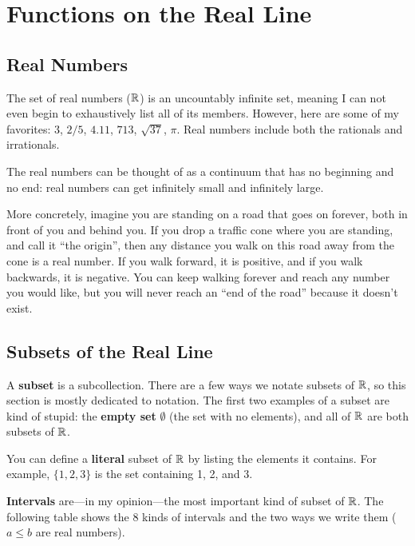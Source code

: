 \section{Functions on the Real Line}

\subsection{Real Numbers}

The set of real numbers ($\mathbb{R}$) is an uncountably infinite set, meaning I can not even begin to exhaustively list all of its members. However, here are some of my favorites: $3$, $2/5$, $4.11$, $713$, $\sqrt{37}$, $\pi$. Real numbers include both the rationals and irrationals. 

The real numbers can be thought of as a continuum that has no beginning and no end: real numbers can get infinitely small and infinitely large.

More concretely, imagine you are standing on a road that goes on forever, both in front of you and behind you. If you drop a traffic cone where you are standing, and call it ``the origin'', then any distance you walk on this road away from the cone is a real number. If you walk forward, it is positive, and if you walk backwards, it is negative. You can keep walking forever and reach any number you would like, but you will never reach an ``end of the road'' because it doesn't exist.

\subsection{Subsets of the Real Line}

A \textbf{subset} is a subcollection. There are a few ways we notate subsets of $\mathbb{R}$, so this section is mostly dedicated to notation. The first two examples of a subset are kind of stupid: the \textbf{empty set} $\emptyset$ (the set with no elements), and all of $\mathbb{R}$ are both subsets of $\mathbb{R}$.

You can define a \textbf{literal} subset of $\mathbb{R}$ by listing the elements it contains. For example, $\{1,2,3\}$ is the set containing 1, 2, and 3.

\textbf{Intervals} are---in my opinion---the most important kind of subset of $\mathbb{R}$. The following table shows the 8 kinds of intervals and the two ways we write them ($a\leq b$ are real numbers).

